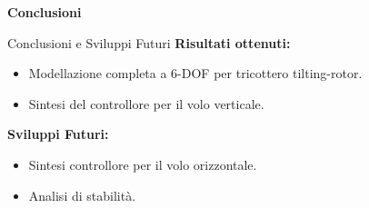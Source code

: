 \documentclass[aspectratio=169]{beamer} %
\begin{document}
\begin{frame}
    \vfill
    \centering
    {\Huge \textbf{Conclusioni}}
    \vfill
\end{frame}

\begin{frame}{Conclusioni e Sviluppi Futuri}
    \textbf{Risultati ottenuti:}
    \begin{itemize}
        \item Modellazione completa a 6-DOF per tricottero tilting-rotor.
        \item Sintesi del controllore per il volo verticale.
    \end{itemize}
    
    \vspace{0.8cm}
    \textbf{Sviluppi Futuri:}
    \begin{itemize}
        \item Sintesi controllore per il volo orizzontale.
        \item Analisi di stabilità.
    \end{itemize}
\end{frame}

    
\end{document}
